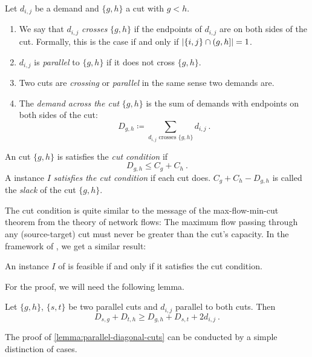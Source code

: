 \begin{definition}
	Let $d_{i, j}$ be a demand and $\{g, h\}$ a cut with $g < h$.
	\begin{enumerate}
		\item We say that $d_{i, j}$ \emph{crosses} $\{g, h\}$ if the endpoints of $d_{i, j}$ are on both sides of the cut.
		Formally, this is the case if and only if $\abs{\{i, j\} \cap (g, h]} = 1$.
		\item $d_{i, j}$ is \emph{parallel} to $\{g, h\}$ if it does not cross $\{g, h\}$.
		\item Two cuts are \emph{crossing} or \emph{parallel} in the same sense two demands are.
		\item The \emph{demand across the cut} $\{g, h\}$ is the sum of demands with endpoints on both sides of the cut:
		\begin{equation}
			\label{eq:cut-demand-definition}
			D_{g,h} \coloneqq \sum_{d_{i,j} \text{ crosses } \{g, h\} } d_{i, j}\ .
		\end{equation}
	\end{enumerate}
\end{definition}

\begin{definition}
	An cut $\{g, h\}$ is satisfies the \emph{cut condition} if
	\begin{equation}
		D_{g,h} \leq C_g + C_h \ .
	\end{equation}
	A \RRLWC instance $I$ \emph{satisfies the cut condition} if each cut does.
	$C_g + C_h - D_{g,h}$ is called the \emph{slack} of the cut $\{g, h\}$.
\end{definition}

The cut condition is quite similar to the message of the max-flow-min-cut theorem from the theory of network flows:
The maximum flow passing through any (source-target) cut must never be greater than the cut's capacity.
In the framework of \RRLWC, we get a similar result:

\begin{theorem}
	\label{theo:cut-condition}
	An instance $I$ of \RRLWC is feasible if and only if it satisfies the cut condition.
\end{theorem}
For the proof, we will need the following lemma.
\begin{lemma}
	\label{lemma:parallel-diagonal-cuts}
	Let $\{g, h\}$, $\{s, t\}$ be two parallel cuts and $d_{i, j}$ parallel to both cuts.
	Then
	\begin{equation}
		D_{s,g} + D_{t,h} \geq D_{g,h} + D_{s,t} + 2 d_{i,j} \ .
	\end{equation}
\end{lemma}
The proof of \cref{lemma:parallel-diagonal-cuts} can be conducted by a simple distinction of cases.

